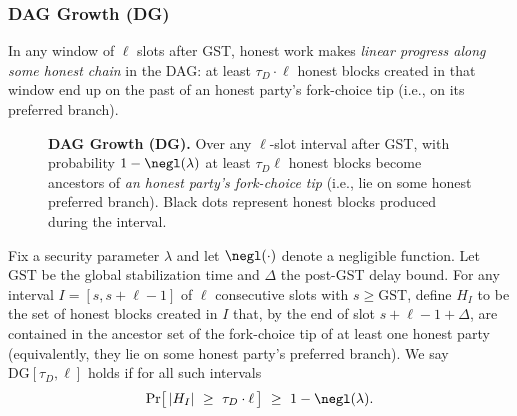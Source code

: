 \subsubsection{DAG Growth (DG)}
\label{app:DG}

In any window of $\ell$ slots after GST, honest work makes \emph{linear progress along some honest chain} in the DAG: at least $\tau_D\cdot \ell$ honest blocks created in that window end up on the past of an honest party’s fork-choice tip (i.e., on its preferred branch).

\begin{figure}[htp!]
\centering
{}
\caption{\textbf{DAG Growth (DG).}
\small
Over any $\ell$-slot interval after GST, with probability $1-\negl(\lambda)$ at least $\tau_D\ell$ honest blocks become ancestors of \emph{an honest party’s fork-choice tip} (i.e., lie on some honest preferred branch). 
Black dots represent honest blocks produced during the interval.}

\label{fig:dg}
\end{figure}

\begin{definition}\label{appdef:DG}
Fix a security parameter $\lambda$ and let $\negl(\cdot)$ denote a negligible function.
Let $\mathrm{GST}$ be the global stabilization time and $\Delta$ the post-GST delay bound.
For any interval $I=[s,s+\ell-1]$ of $\ell$ consecutive slots with $s\ge \mathrm{GST}$, define $H_I$ to be the set of honest blocks created in $I$ that, by the end of slot $s+\ell-1+\Delta$, are contained in the ancestor set of the fork-choice tip of at least one honest party (equivalently, they lie on some honest party’s preferred branch).
We say $\mathrm{DG}[\tau_D,\ell]$ holds if for all such intervals
\[
\Pr\!\big[\,|H_I|\ \ge\ \tau_D\cdot \ell\,\big]\ \ge\ 1-\negl(\lambda).
\]
\end{definition}

